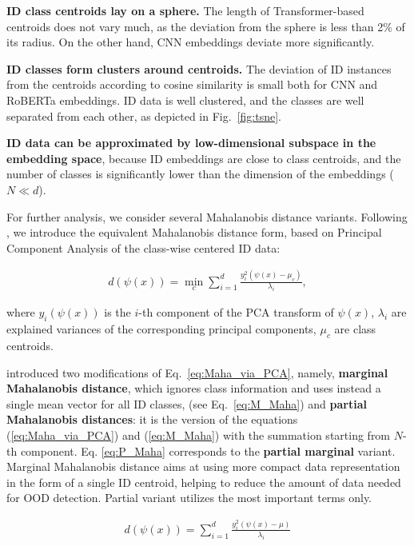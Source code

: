 \documentclass[letterpaper, final]{article} %
\begin{document}
{\bf ID class centroids lay on a sphere.} The length of Transformer-based centroids  does not vary much, as the deviation from the sphere is less than 2\% of its radius. On the other hand, CNN embeddings deviate more significantly.

{\bf ID classes form clusters around centroids.} The deviation of ID instances from the centroids according to cosine similarity is small both for CNN and RoBERTa embeddings. ID data is well clustered, and the classes are well separated from each other, as depicted in Fig.~\ref{fig:tsne}.


{\bf ID data can be approximated by low-dimensional subspace in the embedding space}, because ID embeddings are close to class centroids, and the number of classes is significantly lower than the dimension of the embeddings ($N \ll d$).

For further analysis, we consider several Mahalanobis distance variants. Following \citet*{Kamoi2020WhyIT}, we introduce the equivalent Mahalanobis distance form, based on  Principal Component Analysis of the class-wise centered ID data:


\begin{equation}
\begin{gathered}
d(\psi(x))=\min\limits_{c}\sum\limits_{i=1}^{d}\frac{y_i^2(\psi(x) - \mu_c)}{\lambda_i},
\end{gathered}
\label{eq:Maha_via_PCA}
\end{equation}

where $y_i(\psi(x))$ is the $i$-th component of the PCA transform of $\psi(x)$, $\lambda_i$ are explained variances of the corresponding principal components, $\mu_c$ are class centroids.

\citet*{Kamoi2020WhyIT} introduced two modifications of Eq.~\ref{eq:Maha_via_PCA}, namely, {\bf marginal Mahalanobis distance}, which  ignores class information and uses instead a single mean vector for all ID classes, (see Eq.~\ref{eq:M_Maha}) and {\bf partial Mahalanobis distances}: it is the version of the equations (\ref{eq:Maha_via_PCA}) and (\ref{eq:M_Maha}) with the summation starting from $N$-th component. Eq. \ref{eq:P_Maha} corresponds to the {\bf partial marginal} variant. Marginal Mahalanobis distance aims at using more compact data representation in the form of a single ID centroid, helping to reduce the amount of data needed for OOD detection. Partial variant utilizes  the most important terms only.

\begin{equation}
\begin{gathered}
        d(\psi(x))=\sum\limits_{i=1}^{d}\frac{y_i^2(\psi(x)-\mu)}{\lambda_i}
\end{gathered}
\label{eq:M_Maha}
\end{equation}
\end{document}
